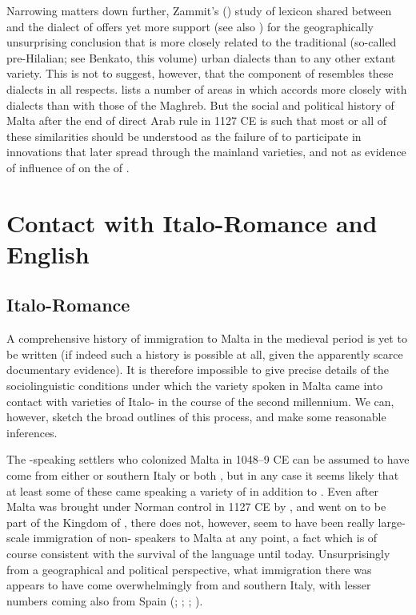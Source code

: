 \documentclass[output=paper]{langsci/langscibook}
\begin{document}
Narrowing matters down further, Zammit's (\citeyear{zammit2014}) study of lexicon shared between  and the  dialect of  offers yet more support (see also \citealt{Vanhove1998}) for the geographically unsurprising conclusion that  is more closely related to the traditional (so-called pre-Hilalian; see Benkato, this volume) urban  dialects than to any other extant  variety. This is not to suggest, however, that the  component of  resembles these dialects in all respects. \cite{Borg1996} lists a number of areas in which  accords more closely with   dialects than with those of the Maghreb. But the social and political history of Malta after the end of direct Arab rule in 1127 CE is such that most or all of these similarities should be understood as the failure of  to participate in innovations that later spread through the mainland  varieties, and not as evidence of influence of   on the  of .

\section{Contact with Italo-Romance and English}
\subsection{Italo-Romance}

A comprehensive history of immigration to Malta in the medieval period is yet to be written (if indeed such a history is possible at all, given the apparently scarce documentary evidence). It is therefore impossible to give precise details of the sociolinguistic conditions under which the  variety spoken in Malta came into contact with varieties of Italo- in the course of the second millennium. We can, however, sketch the broad outlines of this process, and make some reasonable inferences.

The -speaking settlers who colonized Malta in 1048--9 CE can be assumed to have come from either  or southern Italy or both \citep[22]{brincat1995}, but in any case it seems likely that at least some of these came speaking a variety of  in addition to . Even after Malta was brought under Norman control in 1127 CE by , and went on to be part of the Kingdom of , there does not, however, seem to have been really large-scale immigration of non- speakers to Malta at any point, a fact which is of course consistent with the survival of the  language until today. Unsurprisingly from a geographical and political perspective, what immigration there was appears to have come overwhelmingly from  and southern Italy, with lesser numbers coming also from Spain (\citealt[134, 289]{ballou1893}; \citealt[43--46]{blouet1967}; \citealt{fiorini1986}; \citealt[26--32]{goodwin2002}).
\end{document}
